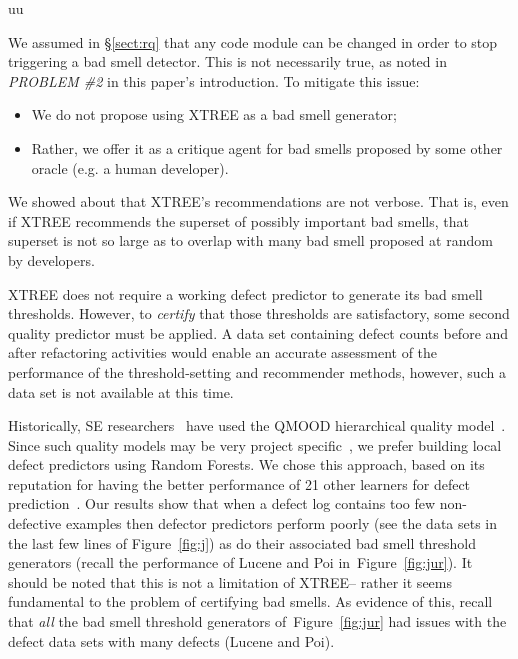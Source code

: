 uu \documentclass[final,twocolumn,5p]{elsarticle}
\newcommand{\tion}[1]{\S\ref{sect:#1}}
\newcommand{\fig}[1]{Figure~\ref{fig:#1}}
\theoremstyle{break}
\begin{document}
\begin{itemize}
We assumed in \tion{rq}
that any code module can be changed in order
to stop triggering a bad smell detector. This is not necessarily
true, as noted in {\em PROBLEM \#2} in this paper's introduction.
To mitigate this issue:
\begin{itemize}
    \item We do not propose using XTREE as a bad
smell generator;
\item Rather, we offer it as  a critique agent for bad smells
proposed by some other oracle (e.g. a human developer).
\end{itemize}
We showed about that XTREE's recommendations are not verbose.
That is, even if XTREE recommends the superset of possibly important bad smells,
that superset is not so large as to  overlap with many
 bad smell proposed at random 
by   developers. 

XTREE does not require a working defect predictor to generate
its bad smell thresholds. However, to {\em certify}
that those thresholds are satisfactory, some
second quality predictor must be applied. A data set containing defect counts before and after refactoring activities would enable an accurate assessment of the performance of the threshold-setting and recommender methods, however, such a data set is not available at this time.

 Historically,
SE researchers~\cite{Cheng10,OKeeffe08,OKeeffe07,Moghadam2011,Mkaouer14} have used the QMOOD hierarchical quality model~\cite{Bansiya02}.
Since such quality models may be very project specific~\cite{localvsglobal}, we prefer building local 
defect predictors using Random Forests. We chose this approach,  based on its reputation for having the better  performance of 21 other learners for defect prediction~\cite{lessmann}.  
Our results show that when a defect log contains too few
non-defective examples then defector predictors
perform poorly (see the data sets in the last few lines of \fig{j})
as do their associated bad smell threshold generators
(recall the performance of Lucene and Poi in~\fig{jur}). It should be noted that this is not a limitation of XTREE-- rather
it seems fundamental to the problem of certifying bad smells.
As evidence of this, recall that {\em all} the bad smell threshold generators of~\fig{jur}
had issues with the defect data sets with  many defects
(Lucene and Poi).



\end{itemize}
\end{document}
